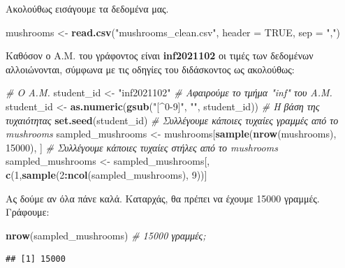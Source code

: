 \documentclass[
]{article}
\newenvironment{Shaded}{\begin{snugshade}}{\end{snugshade}}
\newcommand{\AttributeTok}[1]{\textcolor[rgb]{0.13,0.29,0.53}{#1}}
\newcommand{\CommentTok}[1]{\textcolor[rgb]{0.56,0.35,0.01}{\textit{#1}}}
\newcommand{\ConstantTok}[1]{\textcolor[rgb]{0.56,0.35,0.01}{#1}}
\newcommand{\DecValTok}[1]{\textcolor[rgb]{0.00,0.00,0.81}{#1}}
\newcommand{\FunctionTok}[1]{\textcolor[rgb]{0.13,0.29,0.53}{\textbf{#1}}}
\newcommand{\NormalTok}[1]{#1}
\newcommand{\OtherTok}[1]{\textcolor[rgb]{0.56,0.35,0.01}{#1}}
\newcommand{\SpecialCharTok}[1]{\textcolor[rgb]{0.81,0.36,0.00}{\textbf{#1}}}
\newcommand{\StringTok}[1]{\textcolor[rgb]{0.31,0.60,0.02}{#1}}
\begin{document}
Ακολούθως εισάγουμε τα δεδομένα μας.

\begin{Shaded}
\begin{Highlighting}[]
\NormalTok{mushrooms }\OtherTok{\textless{}{-}} \FunctionTok{read.csv}\NormalTok{(}\StringTok{"mushrooms\_clean.csv"}\NormalTok{,}
                     \AttributeTok{header =} \ConstantTok{TRUE}\NormalTok{, }\AttributeTok{sep =} \StringTok{","}\NormalTok{)}
\end{Highlighting}
\end{Shaded}

Καθόσον ο Α.Μ. του γράφοντος είναι \textbf{inf2021102} οι τιμές των
δεδομένων αλλοιώνονται, σύμφωνα με τις οδηγίες του διδάσκοντος ως
ακολούθως:

\begin{Shaded}
\begin{Highlighting}[]
\CommentTok{\# Ο Α.Μ.}
\NormalTok{student\_id }\OtherTok{\textless{}{-}} \StringTok{"inf2021102"}
\CommentTok{\# Αφαιρούμε το τμήμα "inf" του Α.Μ.}
\NormalTok{student\_id }\OtherTok{\textless{}{-}} \FunctionTok{as.numeric}\NormalTok{(}\FunctionTok{gsub}\NormalTok{(}\StringTok{"[\^{}0{-}9]"}\NormalTok{, }\StringTok{""}\NormalTok{, student\_id))}
\CommentTok{\# Η βάση της τυχαιότητας}
\FunctionTok{set.seed}\NormalTok{(student\_id)}
\CommentTok{\# Συλλέγουμε κάποιες τυχαίες γραμμές από το mushrooms}
\NormalTok{sampled\_mushrooms }\OtherTok{\textless{}{-}}\NormalTok{ mushrooms[}\FunctionTok{sample}\NormalTok{(}\FunctionTok{nrow}\NormalTok{(mushrooms), }\DecValTok{15000}\NormalTok{), ]}
\CommentTok{\# Συλλέγουμε κάποιες τυχαίες στήλες από το mushrooms}
\NormalTok{sampled\_mushrooms }\OtherTok{\textless{}{-}}\NormalTok{ sampled\_mushrooms[, }\FunctionTok{c}\NormalTok{(}\DecValTok{1}\NormalTok{,}\FunctionTok{sample}\NormalTok{(}\DecValTok{2}\SpecialCharTok{:}\FunctionTok{ncol}\NormalTok{(sampled\_mushrooms), }\DecValTok{9}\NormalTok{))]}
\end{Highlighting}
\end{Shaded}

Ας δούμε αν όλα πάνε καλά. Καταρχάς, θα πρέπει να έχουμε 15000 γραμμές.
Γράφουμε:

\begin{Shaded}
\begin{Highlighting}[]
\FunctionTok{nrow}\NormalTok{(sampled\_mushrooms) }\CommentTok{\# 15000 γραμμές;}
\end{Highlighting}
\end{Shaded}

\begin{verbatim}
## [1] 15000
\end{verbatim}
\end{document}
